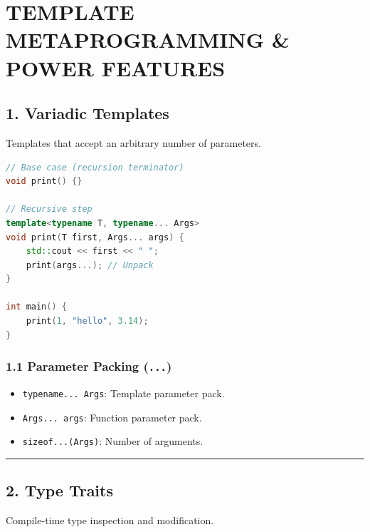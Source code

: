 \hypertarget{template-metaprogramming-power-features}{%
\chapter{TEMPLATE METAPROGRAMMING \& POWER
FEATURES}\label{template-metaprogramming-power-features}}

\hypertarget{variadic-templates}{%
\section{1. Variadic Templates}\label{variadic-templates}}

Templates that accept an arbitrary number of parameters.

\begin{lstlisting}[language={C++}]
// Base case (recursion terminator)
void print() {}

// Recursive step
template<typename T, typename... Args>
void print(T first, Args... args) {
    std::cout << first << " ";
    print(args...); // Unpack
}

int main() {
    print(1, "hello", 3.14);
}
\end{lstlisting}

\hypertarget{parameter-packing-...}{%
\subsection{\texorpdfstring{1.1 Parameter Packing
(\texttt{...})}{1.1 Parameter Packing (...)}}\label{parameter-packing-...}}

\begin{itemize}
\tightlist
\item
  \passthrough{\lstinline!typename... Args!}: Template parameter pack.
\item
  \passthrough{\lstinline!Args... args!}: Function parameter pack.
\item
  \passthrough{\lstinline!sizeof...(Args)!}: Number of arguments.
\end{itemize}

\begin{center}\rule{0.5\linewidth}{0.5pt}\end{center}

\hypertarget{type-traits}{%
\section{2. Type Traits}\label{type-traits}}

Compile-time type inspection and modification.


